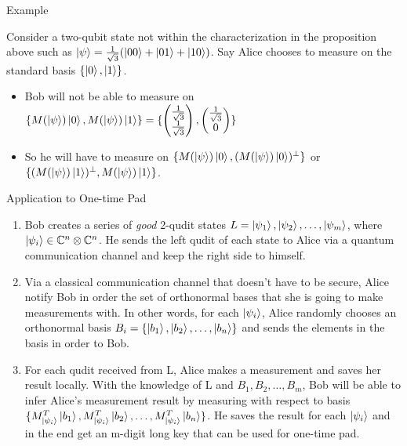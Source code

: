\documentclass[handout, 10 pt]{beamer}
\begin{document}
\begin{frame}{Example}

\begin{block}{}
Consider a two-qubit state not within the characterization in the proposition above such as $\ket{\psi}=\frac{1}{\sqrt{3}}(\ket{00}+\ket{01}+\ket{10})$. Say Alice chooses to measure on the standard basis $\{\ket{0}, \ket{1}\}$.
\end{block}
\begin{itemize}
    \item Bob will not be able to measure on $\{M(\ket{\psi})\ket{0}, M(\ket{\psi})\ket{1}\}=\{\begin{pmatrix}
\frac{1}{\sqrt{3}}\\
\frac{1}{\sqrt{3}}
\end{pmatrix},\begin{pmatrix}
\frac{1}{\sqrt{3}}\\
0
\end{pmatrix}\}$
\item So he will have to measure on $\{M(\ket{\psi})\ket{0}, (M(\ket{\psi})\ket{0})^\perp \}$ or $\{(M(\ket{\psi})\ket{1})^\perp, M(\ket{\psi})\ket{1} \}$.
\end{itemize}
\end{frame}
\begin{frame}{Application to One-time Pad}
    \begin{enumerate}
    \item Bob creates a series of \textit{good} 2-qudit states $L={\ket{\psi_1}, \ket{\psi_2}, \hdots, \ket{\psi_m}}$, where $\ket{\psi_i} \in \mathbb{C}^n \otimes \mathbb{C}^n$. He sends the left qudit of each state to Alice via a quantum communication channel and keep the right side to himself.
    \pause
    \item Via a classical communication channel that doesn't have to be secure, Alice notify Bob in order the set of orthonormal bases that she is going to make measurements with. In other words, for each $\ket{\psi_i}$, Alice randomly chooses an orthonormal basis $B_i=\{\ket{b_1}, \ket{b_2}, \hdots, \ket{b_n}\}$ and sends the elements in the basis in order to Bob.
    \pause
    \item For each qudit received from L, Alice makes a measurement and saves her result locally. With the knowledge of L and $B_1, B_2, \hdots, B_m$, Bob will be able to infer Alice's measurement result by measuring with respect to basis $\{M_{\ket{\psi_i}}^T \ket{b_1}, M_{\ket{\psi_i}}^T \ket{b_2}, \hdots, M_{\ket{\psi_i}}^T \ket{b_n}\}$. He saves the result for each $\ket{\psi_i}$ and in the end get an m-digit long key that can be used for one-time pad.
\end{enumerate}
\end{frame}
\end{document}
